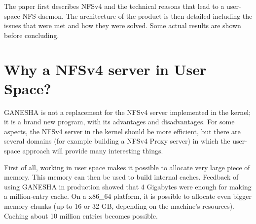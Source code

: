\documentclass[final]{ols}
\begin{document}
The paper first describes NFSv4 and the technical reasons that lead to
a user-space NFS daemon. The architecture of the product is then
detailed including the issues that were met and how they were solved.
Some actual results are shown before concluding.

\section{Why a NFSv4 server in User Space?}
GANESHA is not a replacement for the NFSv4 server implemented in the
kernel; it is a brand new program, with its advantages and
disadvantages.  For some aspects, the NFSv4 server in the kernel
should be more efficient, but there are several domains (for example
building a NFSv4 Proxy server) in which the user-space approach will
provide many interesting things.

First of all, working in user space makes it possible to allocate very large
piece of memory. This memory can then be used to build internal
caches.  Feedback of using GANESHA in production showed that 4
Gigabytes were enough for making a million-entry cache. On a
x86\_64 platform, it is possible to allocate even bigger memory chunks
(up to 16 or 32 GB, depending on the machine's resources). Caching
about 10 million entries becomes possible.
\end{document}
